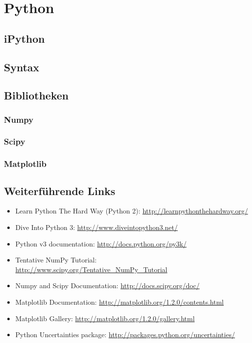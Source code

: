\chapter{Python}
\section{iPython}
\section{Syntax}
\section{Bibliotheken}
\subsection{Numpy}
\subsection{Scipy}
\subsection{Matplotlib}

\section{Weiterführende Links}
\begin{itemize}
  \item Learn Python The Hard Way (Python 2): \url{http://learnpythonthehardway.org/}
  \item Dive Into Python 3: \url{http://www.diveintopython3.net/}
  \item Python v3 documentation: \url{http://docs.python.org/py3k/}
  \item Tentative NumPy Tutorial: \url{http://www.scipy.org/Tentative\_NumPy\_Tutorial}
  \item Numpy and Scipy Documentation: \url{http://docs.scipy.org/doc/}
  \item Matplotlib Documentation: \url{http://matplotlib.org/1.2.0/contents.html}
  \item Matplotlib Gallery: \url{http://matplotlib.org/1.2.0/gallery.html}
  \item Python Uncertainties package: \url{http://packages.python.org/uncertainties/}
\end{itemize}
